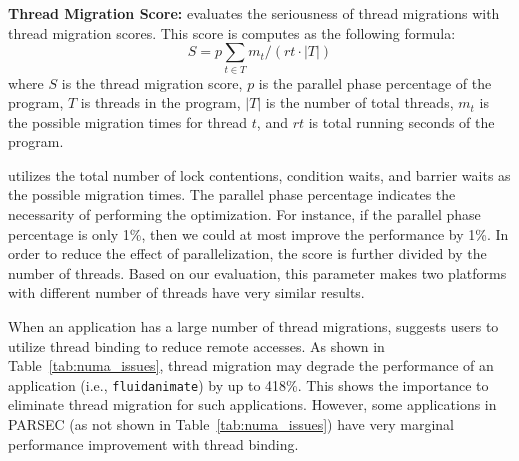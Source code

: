 
\textbf{Thread Migration Score:} \NP{} evaluates the seriousness of thread migrations with thread migration scores. This score is computes as the following formula: 
$$S = p \underset{t \in T}{\sum } m_{t} / (rt \cdot \left | T \right |)$$
where $S$ is the thread migration score, $p$ is the parallel phase percentage of the program, $T$ is threads in the program, $\left | T \right |$ is the number of total threads, $m_t$ is the possible migration times for thread $t$, and $rt$ is total running seconds of the program. 

\NP{} utilizes the total number of lock contentions, condition waits, and barrier waits as the possible migration times. The parallel phase percentage indicates the necessarity of performing the optimization. For instance, if the parallel phase percentage is only 1\%, then we could at most improve the performance by 1\%.   In order to reduce the effect of parallelization, the score is further divided by the number of threads. Based on our evaluation, this parameter makes two platforms with different number of threads have very similar results. 

When an application has a large number of thread migrations,  \NP{} suggests users to utilize thread binding to reduce remote accesses. As shown in Table~\ref{tab:numa_issues}, thread migration may degrade the performance of an application (i.e., \texttt{fluidanimate}) by up to 418\%. This shows the importance to eliminate thread migration for such applications.  However, some applications in PARSEC (as not shown in Table~\ref{tab:numa_issues}) have very marginal performance improvement with thread binding. 


